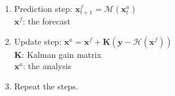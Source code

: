 \documentclass[landscape,a0paper,fontscale=0.3]{baposter} %
\newcommand{\compresslist}{ %
\setlength{\itemsep}{1pt}
\setlength{\parskip}{0pt}
\setlength{\parsep}{0pt}
}
\newcommand{\mx}{\textbf{x}}
\newcommand{\my}{\textbf{y}}
\newcommand{\mK}{\textbf{K}}
\newcommand{\cH}{\mathcal{H}}
\newcommand{\cM}{\mathcal{M}}
\begin{document}
\begin{poster}
{\begin{multicols}{2}
\begin{enumerate}\compresslist
	\item Prediction step: $\mx_{t+1}^f=\cM(\mx_t^a)$ \\ 			$\mx^f$: the forecast
	\item Update step: $\mx^a=\mx^f + \mK(\my - \cH(\mx^f))$\\         $\mK$: Kalman gain matrix \\
			$\mx^a$: the analysis
	\item Repeat the steps.
\end{enumerate}
\end{multicols}

}


\end{poster}
\end{document}
